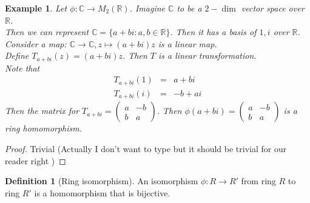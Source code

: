 \documentclass{article}
\theoremstyle{MyNonumberplain}
\theoremstyle{break}
\newtheorem*{proof}{Proof. }
\theoremstyle{break}
\newtheorem{example}{Example}[section]
\theoremstyle{break}
\theoremstyle{definition}
\theoremstyle{break}
\newtheorem{definition}{Definition}[section]
\begin{document}
\begin{expbox}
    \begin{example}
        Let $\phi : \mathbb{C} \rightarrow M_2 (\mathbb{R})$. Imagine $\mathbb{C}$ to
        be a $2 - \dim$ vector space over $\mathbb{R}$.\\
        
        Then we can represent $\mathbb{C}= \{ a + b i : a, b \in \mathbb{R} \}$. Then
        it has a basis of $1, i$ over $\mathbb{R}$.\\
        
        Consider a map: $\mathbb{C} \rightarrow \mathbb{C}, z \mapsto (a + b i) z$ is
        a linear map.\\
        
        Define $T_{a + b i} (z) = (a + b i) z$. Then $T$ is a linear transformation.\\
        
        Note that
        \begin{eqnarray*}
          T_{a + b i} (1) & = & a + b i\\
          T_{a + b i} (i) & = & - b + a i
        \end{eqnarray*}
        Then the matrix for $T_{a + b i} = \left(\begin{array}{cc}
          a & - b\\
          b & a
        \end{array}\right)$. Then $\phi (a + b i) = \left(\begin{array}{cc}
          a & - b\\
          b & a
        \end{array}\right)$ is a ring homomorphism.
    \end{example}
    \begin{prfbox}
        \begin{proof}
            Trivial (Actually I don't want to type but it should be trivial for our reader right )
        \end{proof}
    \end{prfbox}
\end{expbox}

\begin{defbox}
    \begin{definition}[Ring isomorphism]
        An isomorphism $\phi : R \rightarrow R'$ from ring $R$ to ring $R'$ is a
        homomorphism that is bijective.
    \end{definition}
\end{defbox}
\end{document}
